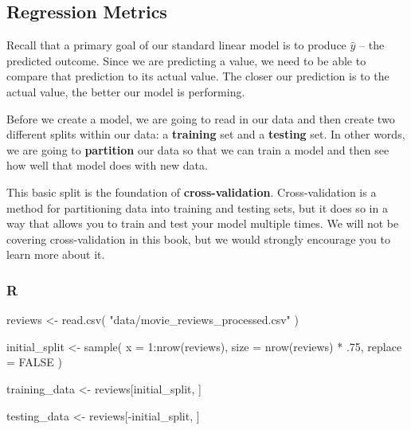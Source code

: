 \documentclass[
  letterpaper,
]{krantz}
\newenvironment{Shaded}{}{}
\newcommand{\AttributeTok}[1]{\textcolor[rgb]{0.49,0.56,0.16}{#1}}
\newcommand{\ConstantTok}[1]{\textcolor[rgb]{0.53,0.00,0.00}{#1}}
\newcommand{\DecValTok}[1]{\textcolor[rgb]{0.25,0.63,0.44}{#1}}
\newcommand{\FunctionTok}[1]{\textcolor[rgb]{0.02,0.16,0.49}{#1}}
\newcommand{\NormalTok}[1]{#1}
\newcommand{\OtherTok}[1]{\textcolor[rgb]{0.00,0.44,0.13}{#1}}
\newcommand{\SpecialCharTok}[1]{\textcolor[rgb]{0.25,0.44,0.63}{#1}}
\newcommand{\StringTok}[1]{\textcolor[rgb]{0.25,0.44,0.63}{#1}}
\begin{document}
\subsection{Regression Metrics}\label{regression-metrics}

Recall that a primary goal of our standard linear model is to produce
\(\hat{y}\) -- the predicted outcome. Since we are predicting a value,
we need to be able to compare that prediction to its actual value. The
closer our prediction is to the actual value, the better our model is
performing.

Before we create a model, we are going to read in our data and then
create two different splits within our data: a \textbf{training} set and
a \textbf{testing} set. In other words, we are going to
\textbf{partition} our data so that we can train a model and then see
how well that model does with new data.

This basic split is the foundation of \textbf{cross-validation}.
Cross-validation is a method for partitioning data into training and
testing sets, but it does so in a way that allows you to train and test
your model multiple times. We will not be covering cross-validation in
this book, but we would strongly encourage you to learn more about it.

\subsubsection{R}

\begin{Shaded}
\begin{Highlighting}[]
\NormalTok{reviews }\OtherTok{\textless{}{-}} \FunctionTok{read.csv}\NormalTok{(}
  \StringTok{"data/movie\_reviews\_processed.csv"}
\NormalTok{)}

\NormalTok{initial\_split }\OtherTok{\textless{}{-}} \FunctionTok{sample}\NormalTok{(}
  \AttributeTok{x =} \DecValTok{1}\SpecialCharTok{:}\FunctionTok{nrow}\NormalTok{(reviews), }
  \AttributeTok{size =} \FunctionTok{nrow}\NormalTok{(reviews) }\SpecialCharTok{*}\NormalTok{ .}\DecValTok{75}\NormalTok{, }
  \AttributeTok{replace =} \ConstantTok{FALSE}
\NormalTok{)}

\NormalTok{training\_data }\OtherTok{\textless{}{-}}\NormalTok{ reviews[initial\_split, ]}

\NormalTok{testing\_data }\OtherTok{\textless{}{-}}\NormalTok{ reviews[}\SpecialCharTok{{-}}\NormalTok{initial\_split, ]}
\end{Highlighting}
\end{Shaded}
\end{document}
